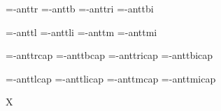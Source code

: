 
\ifx\sizespec\undefined \def\sizespec{}\fi
\ifx\font\corkencoded {}\else {}\fi


\font\tenrm=\tmp-anttr  \sizespec
\font\tenbf=\tmp-anttb  \sizespec
\font\tenit=\tmp-anttri \sizespec
\font\tenbi=\tmp-anttbi \sizespec

\font\tenlr=\tmp-anttl  \sizespec  \def\lr{\tenlr}
\font\tenli=\tmp-anttli \sizespec  \def\li{\tenli}
\font\tenmr=\tmp-anttm  \sizespec  \def\mr{\tenmr}
\font\tenmi=\tmp-anttmi \sizespec  \def\mi{\tenmi}

\font\tenrmc=\tmp-anttrcap  \sizespec
\font\tenbfc=\tmp-anttbcap  \sizespec
\font\tenitc=\tmp-anttricap \sizespec
\font\tenbic=\tmp-anttbicap \sizespec

\font\tenlrc=\tmp-anttlcap  \sizespec 
\font\tenlic=\tmp-anttlicap \sizespec
\font\tenmrc=\tmp-anttmcap  \sizespec
\font\tenmic=\tmp-anttmicap \sizespec

\tenrm


\def\caps#1{{\escapechar=-1 \expandafter}%
  \expandafter\csname\expandafter\tenonlytext\string#1c\endcsname}
\def\tenonlytext{ten}

\ifx\regfontdefault\undefined \else
   \regfontdefault
   \regfont\tenlr  \regfont\tenli
   \regfont\tenmr  \regfont\tenmi
   \regfont\tenrmc \regfont\tenitc
   \regfont\tenbfc \regfont\tenbic
   \regfont\tenlrc \regfont\tenlic
   \regfont\tenmrc \regfont\tenmic
\fi

\def\txr{cs-anttr} \def\txmi{mi-anttri} 
\def\txb{cs-anttb} \def\txbi{mi-anttbi}

\ifx\font\corkencoded\else \ifx\font\unicoded\else  \fi\fi
\ifx\mathpreloaded X\else  \fi                     

